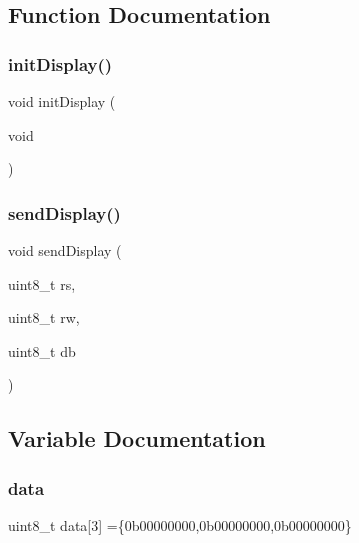 \subsection{Function Documentation}
\mbox{\label{display_8c_a2b00342dede324282512c2d2b17f58b8}} 
\subsubsection{init\+Display()}
{\footnotesize\ttfamily void init\+Display (\begin{DoxyParamCaption}\item[{void}]{ }\end{DoxyParamCaption})}

\mbox{\label{display_8c_a014b0bcd86f1f4e7a9bf3e3687963f9b}} 
\subsubsection{send\+Display()}
{\footnotesize\ttfamily void send\+Display (\begin{DoxyParamCaption}\item[{uint8\+\_\+t}]{rs,  }\item[{uint8\+\_\+t}]{rw,  }\item[{uint8\+\_\+t}]{db }\end{DoxyParamCaption})}



\subsection{Variable Documentation}
\mbox{\label{display_8c_aa99be7b8b4274b2256b394ea7bf80762}} 
\subsubsection{data}
{\footnotesize\ttfamily uint8\+\_\+t data[3] =\{0b00000000,0b00000000,0b00000000\}}


